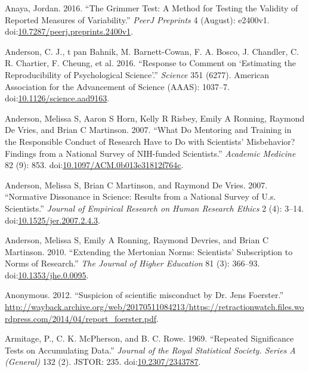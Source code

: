 \documentclass[a5paper]{book}
\begin{document}
\hypertarget{ref-doi:10.7287ux2fpeerj.preprints.2400v1}{}
Anaya, Jordan. 2016. ``The Grimmer Test: A Method for Testing the
Validity of Reported Measures of Variability.'' \emph{PeerJ Preprints} 4
(August): e2400v1.
doi:\href{https://doi.org/10.7287/peerj.preprints.2400v1}{10.7287/peerj.preprints.2400v1}.

\hypertarget{ref-doi:10.1126ux2fscience.aad9163}{}
Anderson, C. J., t pan Bahnik, M. Barnett-Cowan, F. A. Bosco, J.
Chandler, C. R. Chartier, F. Cheung, et al. 2016. ``Response to Comment
on `Estimating the Reproducibility of Psychological Science'.''
\emph{Science} 351 (6277). American Association for the Advancement of
Science (AAAS): 1037--7.
doi:\href{https://doi.org/10.1126/science.aad9163}{10.1126/science.aad9163}.

\hypertarget{ref-doi:10.1097ux2fACM.0b013e31812f764c}{}
Anderson, Melissa S, Aaron S Horn, Kelly R Risbey, Emily A Ronning,
Raymond De Vries, and Brian C Martinson. 2007. ``What Do Mentoring and
Training in the Responsible Conduct of Research Have to Do with
Scientists' Misbehavior? Findings from a National Survey of NIH-funded
Scientists.'' \emph{Academic Medicine} 82 (9): 853.
doi:\href{https://doi.org/10.1097/ACM.0b013e31812f764c}{10.1097/ACM.0b013e31812f764c}.

\hypertarget{ref-doi:10.1525ux2fjer.2007.2.4.3}{}
Anderson, Melissa S, Brian C Martinson, and Raymond De Vries. 2007.
``Normative Dissonance in Science: Results from a National Survey of
U.s. Scientists.'' \emph{Journal of Empirical Research on Human Research
Ethics} 2 (4): 3--14.
doi:\href{https://doi.org/10.1525/jer.2007.2.4.3}{10.1525/jer.2007.2.4.3}.

\hypertarget{ref-doi:10.1353ux2fjhe.0.0095}{}
Anderson, Melissa S, Emily A Ronning, Raymond Devries, and Brian C
Martinson. 2010. ``Extending the Mertonian Norms: Scientists'
Subscription to Norms of Research.'' \emph{The Journal of Higher
Education} 81 (3): 366--93.
doi:\href{https://doi.org/10.1353/jhe.0.0095}{10.1353/jhe.0.0095}.

\hypertarget{ref-foerster-complaint}{}
Anonymous. 2012. ``Suspicion of scientific misconduct by Dr. Jens
Foerster.''
\url{http://wayback.archive.org/web/20170511084213/https://retractionwatch.files.wordpress.com/2014/04/report_foerster.pdf}.

\hypertarget{ref-doi:10.2307ux2f2343787}{}
Armitage, P., C. K. McPherson, and B. C. Rowe. 1969. ``Repeated
Significance Tests on Accumulating Data.'' \emph{Journal of the Royal
Statistical Society. Series A (General)} 132 (2). JSTOR: 235.
doi:\href{https://doi.org/10.2307/2343787}{10.2307/2343787}.
\end{document}
